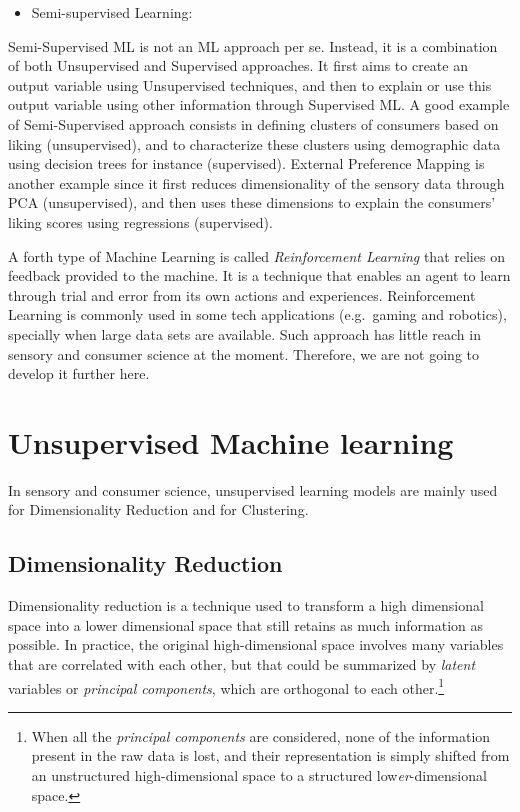 \documentclass[
]{krantz}
\providecommand{\tightlist}{%
  \setlength{\itemsep}{0pt}\setlength{\parskip}{0pt}}
\renewenvironment{quote}{\begin{VF}}{\end{VF}}
\begin{document}
\begin{itemize}
\tightlist
\item
  Semi-supervised Learning:
\end{itemize}

Semi-Supervised ML is not an ML approach per se. Instead, it is a combination of both Unsupervised and Supervised approaches. It first aims to create an output variable using Unsupervised techniques, and then to explain or use this output variable using other information through Supervised ML. A good example of Semi-Supervised approach consists in defining clusters of consumers based on liking (unsupervised), and to characterize these clusters using demographic data using decision trees for instance (supervised). External Preference Mapping is another example since it first reduces dimensionality of the sensory data through PCA (unsupervised), and then uses these dimensions to explain the consumers' liking scores using regressions (supervised).

\begin{quote}
A forth type of Machine Learning is called \emph{Reinforcement Learning} that relies on feedback provided to the machine. It is a technique that enables an agent to learn through trial and error from its own actions and experiences. Reinforcement Learning is commonly used in some tech applications (e.g.~gaming and robotics), specially when large data sets are available. Such approach has little reach in sensory and consumer science at the moment. Therefore, we are not going to develop it further here.
\end{quote}

\hypertarget{unsupervised-machine-learning}{%
\section{Unsupervised Machine learning}\label{unsupervised-machine-learning}}

In sensory and consumer science, unsupervised learning models are mainly used for Dimensionality Reduction and for Clustering.

\hypertarget{dimensionality-reduction}{%
\subsection{Dimensionality Reduction}\label{dimensionality-reduction}}

Dimensionality reduction is a technique used to transform a high dimensional space into a lower dimensional space that still retains as much information as possible. In practice, the original high-dimensional space involves many variables that are correlated with each other, but that could be summarized by \emph{latent} variables or \emph{principal components}, which are orthogonal to each other.\footnote{When all the \emph{principal components} are considered, none of the information present in the raw data is lost, and their representation is simply shifted from an unstructured high-dimensional space to a structured low\emph{er}-dimensional space.}
\end{document}
